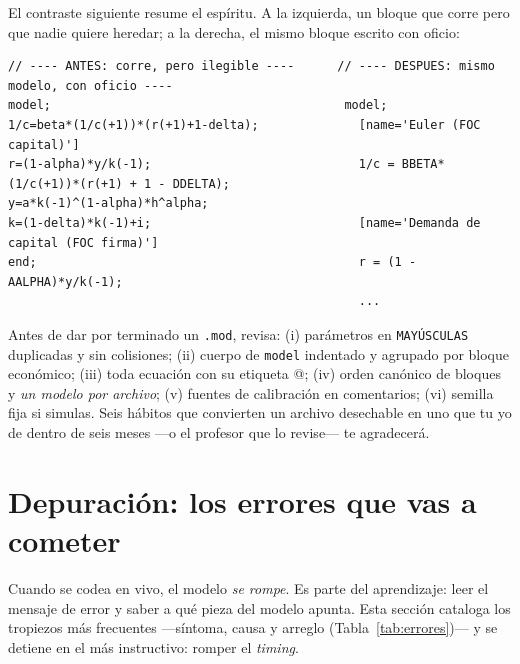 \documentclass[11pt,a4paper]{report}
\newenvironment{tipbox}[1][]{%
  \begin{tcolorbox}[tipstyle, title={\tipicon~~Buena práctica%
    \ifx\relax#1\relax\else: #1\fi}]}%
{\end{tcolorbox}}
\newcommand{\code}[1]{\texttt{#1}}
\newcommand{\tipicon}{\raisebox{-1pt}{\begin{tikzpicture}[scale=0.12,baseline=-0.5ex,line cap=round]
  \draw[line width=1.9pt] (0,1.05) circle (0.92);
  \draw[line width=1.9pt] (-0.48,0.12) -- (0.48,0.12);
  \draw[line width=1.9pt] (-0.44,-0.18) -- (0.44,-0.18);
  \draw[line width=1.9pt] (-0.34,-0.48) -- (0.34,-0.48);
  \draw[line width=1.5pt] (0,2.35) -- (0,2.95);
  \draw[line width=1.5pt] (1.35,1.05) -- (1.95,1.05);
  \draw[line width=1.5pt] (-1.35,1.05) -- (-1.95,1.05);
  \draw[line width=1.5pt] (1.0,2.05) -- (1.45,2.5);
  \draw[line width=1.5pt] (-1.0,2.05) -- (-1.45,2.5);
\end{tikzpicture}}}
\begin{document}
El contraste siguiente resume el espíritu. A la izquierda, un bloque que corre pero
que nadie quiere heredar; a la derecha, el mismo bloque escrito con oficio:

\begin{lstlisting}[numbers=none,basicstyle=\ttfamily\scriptsize]
// ---- ANTES: corre, pero ilegible ----      // ---- DESPUES: mismo modelo, con oficio ----
model;                                         model;
1/c=beta*(1/c(+1))*(r(+1)+1-delta);              [name='Euler (FOC capital)']
r=(1-alpha)*y/k(-1);                             1/c = BBETA*(1/c(+1))*(r(+1) + 1 - DDELTA);
y=a*k(-1)^(1-alpha)*h^alpha;
k=(1-delta)*k(-1)+i;                             [name='Demanda de capital (FOC firma)']
end;                                             r = (1 - AALPHA)*y/k(-1);
                                                 ...
\end{lstlisting}

\begin{tipbox}[la lista de verificación]
Antes de dar por terminado un \code{.mod}, revisa: (i) parámetros en
\code{MAYÚSCULAS} duplicadas y sin colisiones; (ii) cuerpo de \code{model}
indentado y agrupado por bloque económico; (iii) toda ecuación con su etiqueta
\lstinline@[name='...']@; (iv) orden canónico de bloques y \emph{un modelo por
archivo}; (v) fuentes de calibración en comentarios; (vi) semilla fija si simulas.
Seis hábitos que convierten un archivo desechable en uno que tu yo de dentro de
seis meses ---o el profesor que lo revise--- te agradecerá.
\end{tipbox}

\section{Depuración: los errores que vas a cometer}
\label{sec:debug}

Cuando se codea en vivo, el modelo \emph{se rompe}. Es parte del aprendizaje:
leer el mensaje de error y saber a qué pieza del modelo apunta. Esta sección
cataloga los tropiezos más frecuentes ---síntoma, causa y arreglo
(Tabla~\ref{tab:errores})--- y se detiene en el más instructivo: romper el
\emph{timing}.
\end{document}
